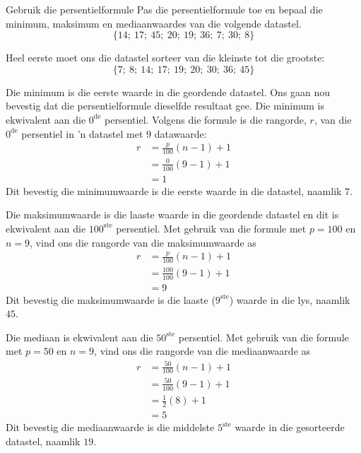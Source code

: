 \begin{wex}{Gebruik die persentielformule}
{Pas die persentielformule toe en bepaal die minimum, maksimum en mediaanwaardes van die volgende datastel. 
    \begin{equation*}
      \{14;\ 17;\ 45;\ 20;\ 19;\ 36;\ 7;\ 30;\ 8\}
    \end{equation*}
}{

  Heel eerste moet ons die datastel sorteer van die kleinste tot die grootste:
    \begin{equation*}
      \{7;\ 8;\ 14;\ 17;\ 19;\ 20;\ 30;\ 36;\ 45\}
    \end{equation*}


    Die minimum is die eerste waarde in die geordende datastel. Ons gaan nou bevestig dat die persentielformule dieselfde resultaat gee. Die minimum is ekwivalent aan die $0^{\mathrm{de}}$ persentiel. Volgens die formule is die rangorde, $r$, van die $0^{\mathrm{de}}$ persentiel in ’n datastel met $9$ datawaarde:
    \begin{align*}
      r &= \frac{p}{100}\left(n-1\right)+1 \\
        &= \frac{0}{100}\left(9-1\right)+1 \\
        &= 1
    \end{align*}
    Dit bevestig die minimumwaarde is die eerste waarde in die datastel, naamlik $7$.


    Die maksimumwaarde is die laaste waarde in die geordende datastel en dit is ekwivalent aan die $100^{\mathrm{ste}}$
    persentiel. Met gebruik van die formule met $p=100$ en $n=9$,
     vind ons die rangorde van die maksimumwaarde as
    \begin{align*}
      r &= \frac{p}{100}\left(n-1\right)+1 \\
        &= \frac{100}{100}\left(9-1\right)+1 \\
        &= 9
    \end{align*}
    Dit bevestig die maksimumwaarde is die laaste ($9^{\mathrm{ste}}$) waarde in die lys, naamlik $45$.


    Die mediaan is ekwivalent aan die $50^{\mathrm{ste}}$ persentiel. Met gebruik van die formule met $p=50$ en $n=9$, vind ons die rangorde van die mediaanwaarde as
    \begin{align*}
      r &= \frac{50}{100}\left(n-1\right)+1 \\
        &= \frac{50}{100}\left(9-1\right)+1 \\
        &= \frac{1}{2}(8)+1 \\
        &= 5
    \end{align*}
    Dit bevestig die mediaanwaarde is die middelste $5^{\mathrm{ste}}$ waarde in die gesorteerde datastel, naamlik  $19$. 
}
\end{wex}

